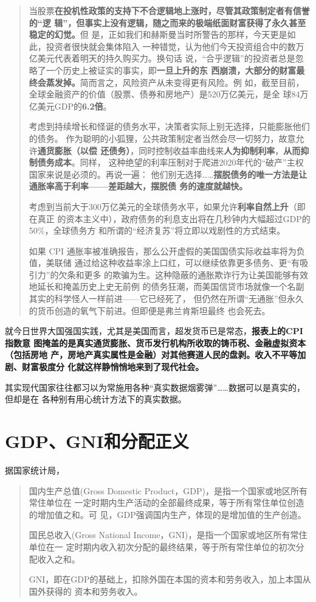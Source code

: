 \begin{quotation}
  当股票\textbf{在投机性政策的支持下不合逻辑地上涨时，尽管其政策制定者有信誉的“逻
    辑”，但事实上没有逻辑，随之而来的极端纸面财富获得了永久甚至稳定的幻觉。}但
  是，正如我们和赫斯曼当时所警告的那样，今天更是如此，投资者很快就会集体陷入
  一种错觉，认为他们今天投资组合中的数万亿美元代表着明天的持久购买力。换句话
  说，“合乎逻辑”的投资者总是忽略了一个历史上被证实的事实，即\textbf{一旦上升的东
    西崩溃，大部分的财富最终会蒸发掉。}简而言之，风险资产从未变得更有风险。例
  如，截至目前，全球金融资产的价值（股票、债券和房地产）是520万亿美元，是全
  球84万亿美元GDP的\textbf{6.2倍}。

  考虑到持续增长和怪诞的债务水平，决策者实际上别无选择，只能膨胀他们的债务。
  作为聪明的小狐狸，公共政策制定者当然会尽一切努力，故意允许\textbf{通货膨胀（以偿
    还债务）}，同时控制收益率曲线来\textbf{人为抑制利率}，\textbf{从而抑制债务成本}。同样，
  这种绝望的利率压制对于爬进2020年代的“破产”主权国家来说是必须的。再说一遍：
  他们别无选择……\textbf{摆脱债务的唯一方法是让通胀率高于利率——差距越大，摆脱债
    务的速度就越快。}

  考虑到当前大于300万亿美元的全球债务水平，如果允许\textbf{利率自然上升}（即在真正
  的资本主义中），政府债务的利息支出将在几秒钟内大幅超过GDP的50\%，全球债务方
  和所谓的“经济复苏”将立即以戏剧性的方式结束。

  如果 CPI 通胀率被准确报告，那么公开虚假的美国国债实际收益率将为负值，美联储
  通过给这种收益率涂上口红，可以继续依靠更多债务、更“有吸引力”的欠条和更多
  的欺骗为生。这种隐蔽的通胀欺诈行为让美国能够有效地延长和掩盖历史上史无前例
  的债务狂潮，而美国信贷市场就像一个名副其实的科学怪人一样前进——它已经死了，
  但仍然在所谓“无通胀”但永久的货币创造的氧气下前进。但即便是弗兰肯斯坦最终
  也会死去。
\end{quotation}

就今日世界大国强国实践，尤其是美国而言，超发货币已是常态，\textbf{报表上的CPI指数意
  图掩盖的是真实通货膨胀、货币发行机构所收取的铸币税、金融虚拟资本（包括房地
  产，房地产真实属性是金融）对其他赛道人民的盘剥。收入不平等加剧、财富极度分
  化就这样静悄悄地来到了现代社会。}

其实现代国家往往都习以为常施用各种“真实数据烟雾弹”……数据可以是真实的，但却是在
各种别有用心统计方法下的真实数据。


\section{GDP、GNI和分配正义}

据国家统计局，

\begin{quotation}
  国内生产总值(Gross Domestic Product，GDP)，是指一个国家或地区所有常住单位在
  一定时期内生产活动的全部最终成果，等于所有常住单位创造的增加值之和。可
  见，GDP强调国内生产，体现的是增加值的生产创造。


  国民总收入(Gross National Income，GNI)，是指一个国家或地区所有常住单位在一
  定时期内收入初次分配的最终结果，等于所有常住单位的初次分配收入之和。

  GNI，即在GDP的基础上，扣除外国在本国的资本和劳务收入，加上本国从国外获得的
  资本和劳务收入。
\end{quotation}

